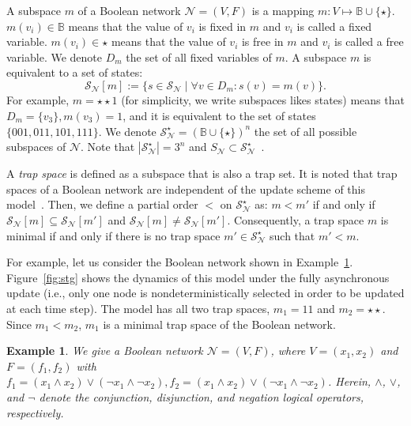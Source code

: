 \documentclass[preprint,12pt]{elsarticle}
\newtheorem{example}{Example}[section]
\begin{document}
A subspace \(m\) of a Boolean network \(\mathcal{N} = (V, F)\) is a mapping \(m \colon V \mapsto \mathbb{B} \cup \{\star\}\).
\(m(v_i) \in \mathbb{B}\) means that the value of \(v_i\) is fixed in \(m\) and \(v_i\) is called a fixed variable.
\(m(v_i) \in \star\) means that the value of \(v_i\) is free in \(m\) and \(v_i\) is called a free variable.
We denote \(D_m\) the set of all fixed variables of \(m\).
A subspace \(m\) is equivalent to a set of states:
\[
\mathcal{S}_{\mathcal{N}}[m] := \{s \in \mathcal{S}_{\mathcal{N}} \mid \forall v \in D_m \colon s(v) = m(v)\}.
\] For example, \(m = \star\star1\) (for simplicity, we write subspaces likes states) means that \(D_m = \{v_3\}, m(v_3) = 1\), and it is equivalent to the set of states \(\{001, 011, 101, 111\}\).
We denote \(\mathcal{S}_{\mathcal{N}}^{\star} = (\mathbb{B} \cup \{\star\})^n\) the set of all possible subspaces of \(\mathcal{N}\).
Note that \(\left\vert\mathcal{S}_{\mathcal{N}}^{\star}\right\vert = 3^n\) and \(S_{\mathcal{N}} \subset \mathcal{S}_{\mathcal{N}}^{\star}\)~\cite{klarner2015computing}.

A \emph{trap space} is defined as a subspace that is also a trap set.
It is noted that trap spaces of a Boolean network are independent of the update scheme of this model~\cite{klarner2015computing}.
Then, we define a partial order \(<\) on \(\mathcal{S}_{\mathcal{N}}^{\star}\) as: \(m < m'\) if and only if \(\mathcal{S}_{\mathcal{N}}[m] \subseteq \mathcal{S}_{\mathcal{N}}[m']\) and \(\mathcal{S}_{\mathcal{N}}[m] \neq \mathcal{S}_{\mathcal{N}}[m']\).
Consequently, a trap space \(m\) is minimal if and only if there is no trap space \(m' \in \mathcal{S}_{\mathcal{N}}^{\star}\) such that \(m' < m\).

For example, let us consider the Boolean network shown in Example~\ref{example:BN}.
Figure~\ref{fig:stg} shows the dynamics of this model under the fully asynchronous update (i.e., only one node is nondeterministically selected in order to be updated at each time step).
The model has all two trap spaces, \(m_1 = 11\) and \(m_2 = \star\star\).
Since \(m_1 < m_2\), \(m_1\) is a minimal trap space of the Boolean network.

\begin{example}
We give a Boolean network \(\mathcal{N} = (V, F)\), where \(V = (x_1, x_2)\) and \(F = (f_1, f_2)\) with \(f_1 = (x_1 \land x_2) \lor (\neg x_1 \land \neg x_2), f_2 = (x_1 \land x_2) \lor (\neg x_1 \land \neg x_2)\). Herein, \(\land\), \(\lor\), and \(\neg\) denote the conjunction, disjunction, and negation logical operators, respectively.\label{example:BN}
\end{example}
\end{document}
